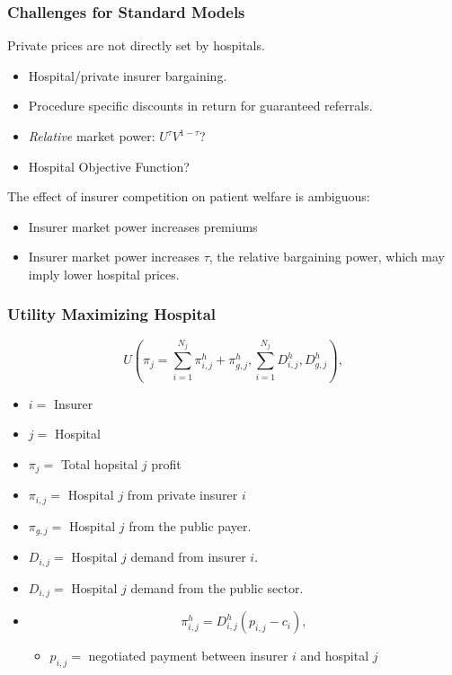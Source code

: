 \documentclass[ucs,9pt]{beamer}
\begin{document}
\begin{frame}
\frametitle{Challenges for Standard Models}
Private prices are not directly set by hospitals.  
\begin{itemize}
\item Hospital/private insurer bargaining.
\item Procedure specific discounts in return for guaranteed referrals.
\item \textit{Relative} market power: $U^{\tau}V^{1-\tau}$?
\item Hospital Objective  Function?  
\end{itemize}
The effect of insurer competition on patient welfare is ambiguous:
\begin{itemize}
\item Insurer market power increases premiums
\item Insurer market power increases $\tau$, the relative bargaining power, which may imply lower hospital prices.  
\end{itemize} 
\end{frame}


\begin{frame}
\frametitle{Utility Maximizing Hospital}
\begin{displaymath}
 U\left( \pi_{j} = \sum_{i=1}^{N_{j}} \pi_{i,j}^{h} + \pi_{g,j}^{h}, \sum_{i=1}^{N_{j}} D_{i,j}^{h}, D_{g,j}^{h} \right),
\end{displaymath}
\begin{itemize}
\item $i=$ Insurer
\item $j=$ Hospital
\item $\pi_{j}=$ Total hopsital $j$ profit
\item $ \pi_{i,j}=$ Hospital $j$ from private insurer $i$
\item $ \pi_{g,j}=$ Hospital $j$ from the public payer.
\item $D_{i,j}=$ Hospital $j$ demand from insurer $i$.
\item $D_{i,j}=$ Hospital $j$ demand from the public sector.
\item[] $$\pi_{i,j}^{h}=D_{i,j}^{h}(p_{i,j}-c_{i}),$$
\begin{itemize}
\item $p_{i,j}=$ negotiated payment between insurer $i$ and hospital $j$
\end{itemize}
\end{itemize}
\end{frame}
\end{document}

